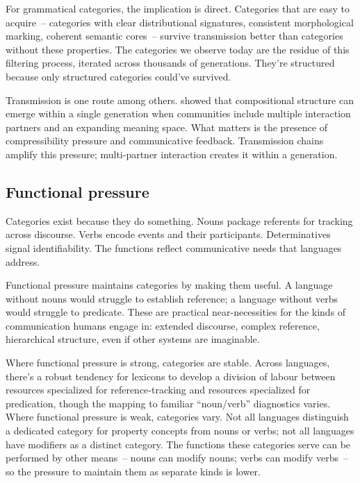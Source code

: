 For grammatical categories, the implication is direct. Categories that are easy to acquire~-- categories with clear distributional signatures, consistent morphological marking, coherent semantic cores~-- survive transmission better than categories without these properties. The categories we observe today are the residue of this filtering process, iterated across thousands of generations. They're structured because only structured categories could've survived.

Transmission is one route among others. \textcite{raviv2019structure} showed that compositional structure can emerge within a single generation when communities include multiple interaction partners and an expanding meaning space. What matters is the presence of compressibility pressure and communicative feedback. Transmission chains amplify this pressure; multi-partner interaction creates it within a generation.

\subsection{Functional pressure}
\label{subsec:4:functional}

Categories exist because they do something. Nouns package referents for tracking across discourse. Verbs encode events and their participants. Determinatives signal identifiability. The functions reflect communicative needs that languages address.

Functional pressure maintains categories by making them useful. A language without nouns would struggle to establish reference; a language without verbs would struggle to predicate. These are practical near-necessities for the kinds of communication humans engage in: extended discourse, complex reference, hierarchical structure, even if other systems are imaginable.

Where functional pressure is strong, categories are stable. Across languages, there's a robust tendency for lexicons to develop a division of labour between resources specialized for reference-tracking and resources specialized for predication, though the mapping to familiar \enquote{noun/verb} diagnostics varies. Where functional pressure is weak, categories vary. Not all languages distinguish a dedicated category for property concepts from nouns or verbs; not all languages have modifiers as a distinct category. The functions these categories serve can be performed by other means~-- nouns can modify nouns; verbs can modify verbs~-- so the pressure to maintain them as separate kinds is lower.

